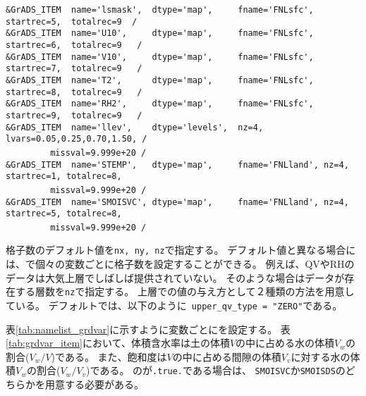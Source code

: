 {\verb|&GrADS_ITEM  name='lsmask',  dtype='map',     fname='FNLsfc', startrec=5,  totalrec=9  /  |  \\
\verb|&GrADS_ITEM  name='U10',     dtype='map',     fname='FNLsfc', startrec=6,  totalrec=9   / |  \\
\verb|&GrADS_ITEM  name='V10',     dtype='map',     fname='FNLsfc', startrec=7,  totalrec=9   / |  \\
\verb|&GrADS_ITEM  name='T2',      dtype='map',     fname='FNLsfc', startrec=8,  totalrec=9   / |  \\
\verb|&GrADS_ITEM  name='RH2',     dtype='map',     fname='FNLsfc', startrec=9,  totalrec=9   / |  \\
\verb|&GrADS_ITEM  name='llev',    dtype='levels',  nz=4, lvars=0.05,0.25,0.70,1.50, /        |  \\
~~~~~~~~\verb| missval=9.999e+20 /|  \\
\verb|&GrADS_ITEM  name='STEMP',   dtype='map',     fname='FNLland', nz=4, startrec=1, totalrec=8,|\\
~~~~~~~~\verb| missval=9.999e+20 /|  \\
\verb|&GrADS_ITEM  name='SMOISVC', dtype='map',     fname='FNLland', nz=4, startrec=5, totalrec=8,|\\
~~~~~~~~\verb| missval=9.999e+20 /|  \\
}

格子数のデフォルト値を\verb|nx, ny, nz|で指定する。
デフォルト値と異なる場合には、で個々の変数ごとに格子数を設定することができる。
例えば、QVやRHのデータは大気上層でしばしば提供されていない。
そのような場合はデータが存在する層数を\verb|nz|で指定する。
上層での値の与え方として２種類の方法を用意している。
デフォルトでは、以下のように\verb| upper_qv_type = "ZERO"|である。\\

表\ref{tab:namelist_grdvar}に示すように変数ごとにを設定する。
表\ref{tab:grdvar_item}において、体積含水率は土の体積$V$の中に占める水の体積$V_w$の割合($V_w / V$)である。
また、飽和度は$V$の中に占める間隙の体積$V_v$に対する水の体積$V_w$の割合($V_w / V_v$)である。
のが\verb|.true.|である場合は、
\verb|SMOISVC|か\verb|SMOISDS|のどちらかを用意する必要がある。

